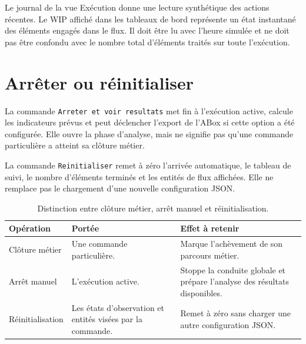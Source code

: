 Le journal de la vue Exécution donne une lecture synthétique des actions récentes. Le WIP affiché dans les tableaux de bord représente un état instantané des éléments engagés dans le flux. Il doit être lu avec l'heure simulée et ne doit pas être confondu avec le nombre total d'éléments traités sur toute l'exécution.


\section{Arrêter ou réinitialiser}

La commande \texttt{Arreter et voir resultats} met fin à l'exécution active, calcule les indicateurs prévus et peut déclencher l'export de l'ABox si cette option a été configurée. Elle ouvre la phase d'analyse, mais ne signifie pas qu'une commande particulière a atteint sa clôture métier.

La commande \texttt{Reinitialiser} remet à zéro l'arrivée automatique, le tableau de suivi, le nombre d'éléments terminés et les entités de flux affichées. Elle ne remplace pas le chargement d'une nouvelle configuration JSON.

\begin{table}[H]
  \centering
  \begin{tabularx}{\textwidth}{L{0.23\textwidth} Y Y}
    \toprule
    Opération & Portée & Effet à retenir \\
    \midrule
    Clôture métier & Une commande particulière. & Marque l'achèvement de son parcours métier. \\
    Arrêt manuel & L'exécution active. & Stoppe la conduite globale et prépare l'analyse des résultats disponibles. \\
    Réinitialisation & Les états d'observation et entités visées par la commande. & Remet à zéro sans charger une autre configuration JSON. \\
    \bottomrule
  \end{tabularx}
  \caption{Distinction entre clôture métier, arrêt manuel et réinitialisation.}
  \label{tab:fin-execution}
\end{table}


